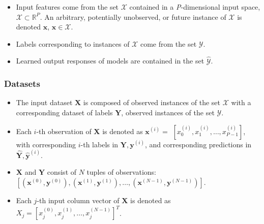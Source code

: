 \documentclass[information,article,submit,moreauthors,pdftex]{definitions/mdpi}
\begin{document}
	\begin{itemize}[leftmargin=*,labelsep=5.8mm]
		\item Input features come from the set $\mathcal{X}$ contained in a \textit{P}-dimensional input space, $\mathcal{X} \subset \mathbb{R}^P$.  An arbitrary, potentially unobserved, or future instance of $\mathcal{X}$ is denoted $\mathbf{x}$, $\mathbf{x} \in \mathcal{X}$.
		\item Labels corresponding to instances of $\mathcal{X}$ come from the set $\mathcal{Y}$.
		\item Learned output responses of models are contained in the set $\mathcal{\hat{Y}}$. %
	\end{itemize}	
	
\subsubsection{Datasets} 

	\begin{itemize}[leftmargin=*,labelsep=5.8mm]
		\item The input dataset $\mathbf{X}$ is composed of observed instances of the set $\mathcal{X}$ with a corresponding dataset of labels $\mathbf{Y}$, observed instances of the set $\mathcal{Y}$. 
		\item Each $i$-th observation of $\mathbf{X}$ is denoted as $\mathbf{x}^{(i)} = $  
		$[x_0^{(i)}, x_1^{(i)}, \dots, x_{\textit{P}-1}^{(i)}]$, with corresponding $i$-th labels in $\mathbf{Y}, \mathbf{y}^{(i)}$, and corresponding predictions in $\mathbf{\hat{Y}}, \mathbf{\hat{y}}^{(i)}$. %
		\item $\mathbf{X}$ and $\mathbf{Y}$ consist of $N$ tuples of observations: $[(\mathbf{x}^{(0)},\mathbf{y}^{(0)}), (\mathbf{x}^{(1)},\mathbf{y}^{(1)}), \dots,(\mathbf{x}^{(N-1)},\mathbf{y}^{(N-1)})]$. %
		\item Each $j$-th input column vector of $\mathbf{X}$ is denoted as $X_j = [x_{j}^{(0)}, x_{j}^{(1)}, \dots, x_{j}^{(N-1)}]^T$.
	\end{itemize}	 
\end{document}
